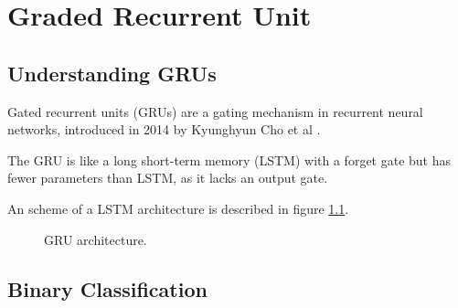 
\chapter{Graded Recurrent Unit} %

\label{Chapter5} %


\section{Understanding GRUs}

Gated recurrent units (GRUs) are a gating mechanism in recurrent neural networks, introduced in 2014 by Kyunghyun Cho et al .

The GRU is like a long short-term memory (LSTM) with a forget gate but has fewer parameters than LSTM, as it lacks an output gate.

An scheme of a LSTM architecture is described in figure \ref{fig:gru}.

\begin{figure}
\begin{center}
\end{center}
\decoRule
\caption[GRU architecture]{GRU architecture.}
\label{fig:gru}
\end{figure}

\section{Binary Classification}

